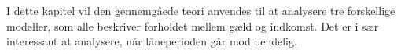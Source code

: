 
I dette kapitel vil den gennemgåede teori anvendes til at analysere tre forskellige modeller, som alle beskriver forholdet mellem gæld og indkomst. Det er i sær interessant at analysere, når låneperioden går mod uendelig.





